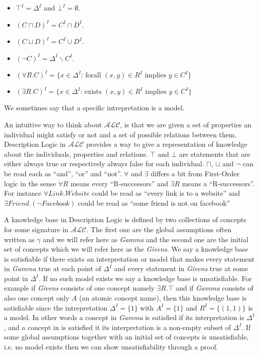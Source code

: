\begin{itemize}
\item $\top^{I} = \Delta^{I}$ and $\bot^{I} = \emptyset$.
\item $(C \sqcap D)^{I} = C^{I} \cap D^{I}$.
\item $(C \sqcup D)^{I} = C^{I} \cup D^{I}$.
\item $(\neg C)^{I} = \Delta^{I} \backslash C^{I}$.
\item $(\forall R . C)^{I} = \{x \in \Delta^{I} \text{: forall } (x,y) \in R^{I} \text{ implies } y \in C^{I}\}$ 
\item $(\exists R . C)^{I} = \{x \in \Delta^{I} \text{: exists } (x,y) \in R^{I} \text{ implies } y \in C^{I}\}$ 
\end{itemize}

We sometimes say that a specific intrepretation is a model. 

An intuitive way to think about $\mathcal{ALC}$, is that we are given
a set of properties an individual might satisfy or not and a set of
possible relations between them. Description Logic in $\mathcal{ALC}$
provides a way to give a representation of knowledge about the
individuals, properties and relations.  $\top$ and $\bot$ are
statements that are either always true or respectively always false
for each individual.  $\sqcap$, $\sqcup$ and $\neg$ can be read each
as ``and'', ``or'' and ``not''. $\forall$ and $\exists$ differs a bit
from First-Order logic in the sense $\forall R$ means every
``R-successors'' and $\exists R$ means a ``R-successors''. For
instance $\forall Link . Website$ could be read as ``every link is to
a website'' and $\exists Friend . (\neg Facebook)$ could be read as
``some friend is not on facebook''

A knowledge base in Description Logic is defined by two collections of
concepts for some signature in $\mathcal{ALC}$. The first one are the
global assumptions often written as $\gamma$ and we will refer here
as \textit{Gamma} and the second one are the initial set of concepts
which we will refer here as the \textit{Givens}. We say a knowledge
base is satisfiable if there exists an interpretation or model that
makes every statement in \textit{Gamma} true at each point of
$\Delta^{I}$ and every statement in \textit{Givens} true at some point
in $\Delta^{I}$. If no such model exists we say a knowledge base is
unsatisfiable. For example if \textit{Givens} consists of one concept
namely $\exists R. \top$ and if \textit{Gamma} consists of also one
concept only $A$ (an atomic concept name), then this knowledge base is
satisfiable since the intrepretation $\Delta^{I} = \{1\}$ with $A^{I}
= \{1\}$ and $R^{I} = \{(1,1)\}$ is a model. In other words a concept
in \textit{Gamma} is satisfied if its interpretation is $\Delta^{I}$,
and a concept in  is satisfied it its interpretation is
a non-empty subset of $\Delta^{I}$. If some global assumptions together
with an initial set of concepts is unsatisfiable, i.e. no model exists 
then we can show unsatisfiability through a proof. 
